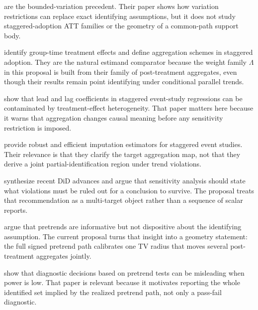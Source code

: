 \documentclass[11pt]{article}
\theoremstyle{definition}
\theoremstyle{plain}
\theoremstyle{remark}
\begin{document}
\citet{ManskiPepper2018BoundedVariation} are the bounded-variation precedent. Their paper shows how variation restrictions can replace exact identifying assumptions, but it does not study staggered-adoption ATT families or the geometry of a common-path support body.

\citet{CallawaySantAnna2021MultiplePeriods} identify group-time treatment effects and define aggregation schemes in staggered adoption. They are the natural estimand comparator because the weight family \(\Lambda\) in this proposal is built from their family of post-treatment aggregates, even though their results remain point identifying under conditional parallel trends.

\citet{SunAbraham2021DynamicEffects} show that lead and lag coefficients in staggered event-study regressions can be contaminated by treatment-effect heterogeneity. That paper matters here because it warns that aggregation changes causal meaning before any sensitivity restriction is imposed.

\citet{BorusyakJaravelSpiess2024EventStudies} provide robust and efficient imputation estimators for staggered event studies. Their relevance is that they clarify the target aggregation map, not that they derive a joint partial-identification region under trend violations.

\citet{RothSantAnnaBilinskiPoe2023TrendingDiD} synthesize recent DiD advances and argue that sensitivity analysis should state what violations must be ruled out for a conclusion to survive. The proposal treats that recommendation as a multi-target object rather than a sequence of scalar reports.

\citet{KahnLangLang2020PromisePitfalls} argue that pretrends are informative but not dispositive about the identifying assumption. The current proposal turns that insight into a geometry statement: the full signed pretrend path calibrates one TV radius that moves several post-treatment aggregates jointly.

\citet{Roth2022PretestCaution} show that diagnostic decisions based on pretrend tests can be misleading when power is low. That paper is relevant because it motivates reporting the whole identified set implied by the realized pretrend path, not only a pass-fail diagnostic.
\end{document}
